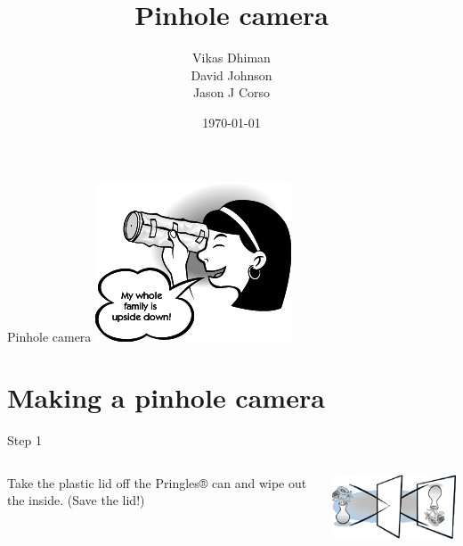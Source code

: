 % 
%

%


\title{Pinhole camera}
\date{\today}
\author{Vikas Dhiman\\ David Johnson\\ Jason J Corso}


\maketitle
\begin{frame}{Pinhole camera}
  \includegraphics{media/girl_looks.png}
\end{frame}

\section{Making a pinhole camera}
\begin{frame}{Step 1}
  \begin{columns}
    \begin{column}{0.4\textwidth}
      Take the plastic lid off the Pringles® can and wipe out the inside. (Save the lid!)
    \end{column}
    \begin{column}{0.6\textwidth}
      \includegraphics{media/upside_down_vase.png}
    \end{column}
  \end{columns}
\end{frame}

